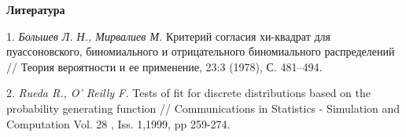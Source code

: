 \smallskip \centerline{\bf Литература}\nopagebreak

1. {\it Большев Л. Н., Мирвалиев М.} Критерий согласия хи-квадрат для пуассоновского, биномиального и отрицательного биномиального распределений // Теория вероятности и ее применение, 23:3 (1978), С. 481--494.

2. {\it Rueda R., O' Reilly F.} Tests of fit for discrete distributions based on the probability generating function // Communications in Statistics - Simulation and Computation Vol. 28 , Iss. 1,1999, pp 259-274.
